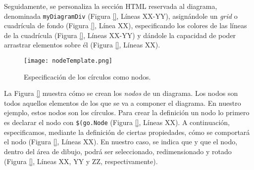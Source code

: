Seguidamente, se personaliza la sección HTML reservada al diagrama, denominada \texttt{myDiagramDiv} (Figura \ref{}, Líneas XX-YY), asignándole un \emph{\emph{grid}} o cuadrícula de fondo (Figura \ref{}, Línea XX), especificando los colores de las líneas de la cuadrícula (Figura \ref{}, Líneas XX-YY) y dándole la capacidad de poder arrastrar elementos sobre él (Figura \ref{}, Líneas XX).


\begin{figure}[!tb]
	\centering
	\texttt{[image: nodeTemplate.png]}
	\caption{Especificación de los círculos como nodos.}
    \label{fig:nodeTemplate}
\end{figure}

La Figura \ref{} muestra cómo se crean los \emph{nodos} de un diagrama. Los nodos son todos aquellos elementos de los que se va a componer el diagrama. En nuestro ejemplo, estos nodos son los círculos. Para crear la definición un nodo lo primero es declarar el nodo con \texttt{\$(go.Node} (Figura \ref{}, Líneas XX). A continuación, especificamos, mediante la definición de ciertas propiedades, cómo se comportará el nodo (Figura \ref{}, Líneas XX). En nuestro caso, se indica que %
y que el nodo, dentro del área de dibujo, podrá ser seleccionado, redimensionado y rotado (Figura \ref{}, Líneas XX, YY y ZZ, respectivamente).



